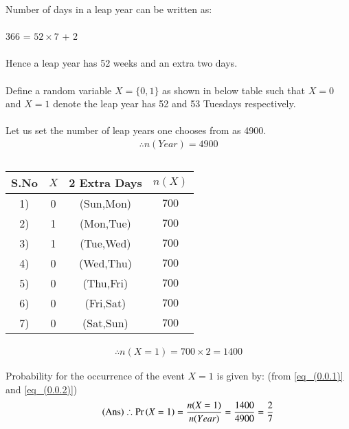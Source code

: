 Number of days in a leap year can be written as:\\
\\366 = $52\times7$ + 2\\
\\Hence a leap year has 52 weeks and an extra two days.\\
\\Define a random variable $X=\{0,1\}$ as shown in below table such that $X=0$ and $X=1$ denote the leap year has 52 and 53 Tuesdays respectively.\\
\\Let us set the number of leap years one chooses from as 4900.
\begin{align}
    \tag{5.6.1}
    \therefore n(Year) = 4900 \label{eq_(0.0.1)}
\end{align}

\begin{table}[h]
\caption{}
\centering
\begin{tabular}{|c|c|c|c|}
\hline
S.No & $X$ & 2 Extra Days & $n(X)$\\
\hline
1)  & 0 & (Sun,Mon) & $700$\\
\hline
2) & 1 & (Mon,Tue) & $700$\\
\hline
3)  & 1 & (Tue,Wed)  & $700$\\
\hline      
4)  & 0 & (Wed,Thu) & $700$ \\
\hline
5) & 0 & (Thu,Fri)  & $700$ \\
\hline
6) & 0 & (Fri,Sat) & $700$\\
\hline
7) & 0 &  (Sat,Sun) & $700$\\
\hline
\end{tabular}
\label{table}
\end{table}

 \begin{align}
  \tag{5.6.2}
  \therefore  n(X=1) = 700\times2 = 1400 \label{eq_(0.0.2)}
\end{align}
 
Probability for the occurrence of the event $X=1$ is given by: (from \eqref{eq_(0.0.1)} and \eqref{eq_(0.0.2)})
\begin{align}
    \tag{Ans}
    \therefore 
     \Pr\left(X=1\right) = \frac{n(X=1)}{n(Year)} = \frac{1400}{4900} = \frac{2}{7}
\end{align}